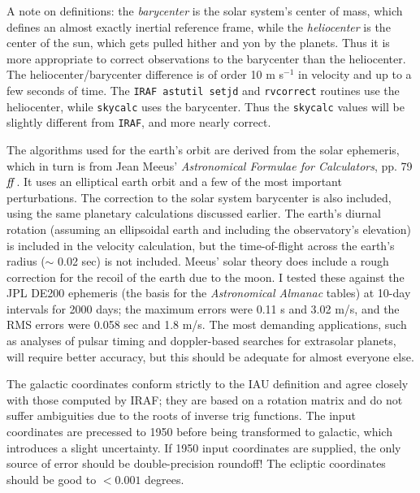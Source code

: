 A note on definitions: the {\sl barycenter} is the solar system's center
of mass, which defines an almost exactly inertial reference frame, while
the {\sl heliocenter} is the
center of the sun, which gets pulled hither and yon by the planets.
Thus it is more appropriate to correct observations to the barycenter
than the heliocenter.  The heliocenter/barycenter difference is of order
10 m s$^{-1}$ in velocity and up to a few seconds of time.  
The {\tt IRAF astutil setjd} and {\tt rvcorrect} routines use the heliocenter,
while {\tt skycalc} uses the barycenter.  Thus the {\tt skycalc} values
will be slightly different from {\tt IRAF}, and more nearly correct.

The algorithms used for the earth's orbit are derived from the solar 
ephemeris, which in turn is from Jean Meeus' 
{\it Astronomical Formulae for Calculators}, pp. 79$\it ff$.  It uses 
an elliptical earth orbit and a few of the most important perturbations.  
The correction to the solar system barycenter is also included, using the same
planetary calculations discussed earlier.  
The earth's diurnal rotation (assuming an ellipsoidal earth and 
including the observatory's elevation) 
is included in the velocity calculation, but the time-of-flight across
the earth's radius ($\sim$ 0.02 sec) is not included.
Meeus' solar theory does include a rough correction for the recoil of
the earth due to the moon.
I tested these against the JPL DE200 ephemeris (the basis for the 
{\it Astronomical Almanac} tables) at 10-day intervals for 
2000 days; the maximum errors were 0.11 s and 3.02 m/s,
and the RMS errors were 0.058 sec and 1.8 m/s.
The most demanding applications, such as analyses of pulsar
timing and doppler-based searches for extrasolar planets, will require
better accuracy, but this should be adequate for almost everyone else.

\par
The galactic coordinates conform strictly to the IAU definition and
agree closely with those computed by IRAF; they are based on a
rotation matrix and do not suffer ambiguities due to the roots of
inverse trig functions.  
The input coordinates are precessed to 1950 before being 
transformed to galactic, which introduces a slight 
uncertainty.  If 1950 input coordinates are supplied,
the only source of error should be double-precision roundoff!
The ecliptic coordinates should be good to $< 0.001$ degrees.


